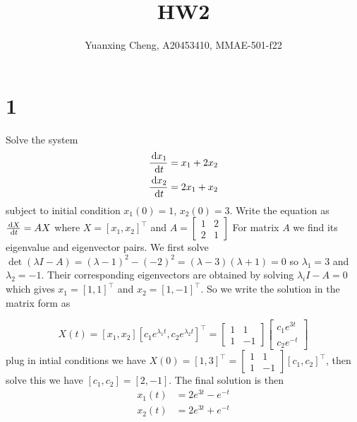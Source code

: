 \documentclass{article}
\title{HW2}
\author{Yuanxing Cheng, A20453410, MMAE-501-f22}
\begin{document}
\maketitle

\section*{1}


\begin{myleftlinebox}
    Solve the system 
    \begin{align*}
        \frac{\,\mathrm{d} x_1}{\,\mathrm{d} t} = x_1 + 2 x_2\\
        \frac{\,\mathrm{d} x_2}{\,\mathrm{d} t} = 2 x_1 + x_2
    \end{align*}
    subject to initial condition \(x_1(0) = 1\), \(x_2(0) = 3\).
    \tcblower
    Write the equation as \(\frac{\,\mathrm{d} X}{\,\mathrm{d} t} = AX\) where \(X = [x_1,x_2]^\top\) and \(A = \begin{bmatrix}
        1 & 2 \\
        2 & 1
    \end{bmatrix}\)
    For matrix \(A\) we find its eigenvalue and eigenvector pairs. We first solve \(\det (\lambda I-A) = (\lambda-1)^2-(-2)^2 = (\lambda-3)(\lambda+1)=0\) so \(\lambda_1 = 3\) and \(\lambda_2 = -1\). Their corresponding eigenvectors are obtained by solving \(\lambda_i I-A=0\) which gives \(x_1 = [1, 1]^\top\) and \(x_2 = [1,-1]^\top\). So we write the solution in the matrix form as

    \begin{equation*}
        X(t) = [x_1,x_2][c_1 e^{\lambda_1 t}, c_2 e^{\lambda_2 t}]^\top = \begin{bmatrix}
            1 & 1\\
            1 & -1
        \end{bmatrix}\begin{bmatrix}
            c_1 e^{3 t}\\
            c_2 e^{-t}
        \end{bmatrix}
    \end{equation*}
    plug in intial conditions we have \(X(0) = [1,3]^\top = \begin{bmatrix}
        1 & 1\\
        1 & -1
    \end{bmatrix}[c_1,c_2]^\top\), then solve this we have \([c_1,c_2]=[2,-1]\). The final solution is then 
    \begin{align*}
        x_1(t) &= 2 e^{3t} - e^{-t}\\
        x_2(t) &= 2 e^{3t} + e^{-t}
    \end{align*}
\end{myleftlinebox}
\end{document}
